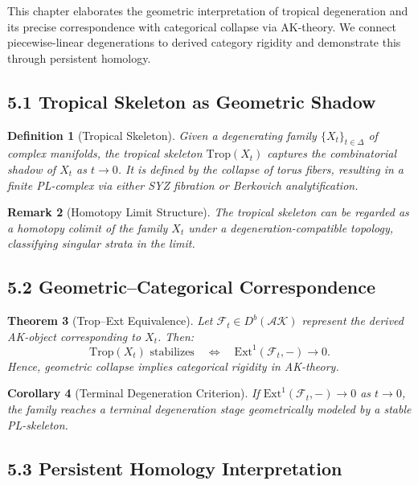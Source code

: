 \documentclass[11pt]{article}
\newtheorem{theorem}{Theorem}[section]
\newtheorem{definition}[theorem]{Definition}
\newtheorem{remark}[theorem]{Remark}
\newtheorem{corollary}[theorem]{Corollary}
\begin{document}
This chapter elaborates the geometric interpretation of tropical degeneration and its precise correspondence with categorical collapse via AK-theory. We connect piecewise-linear degenerations to derived category rigidity and demonstrate this through persistent homology.

\subsection{5.1 Tropical Skeleton as Geometric Shadow}

\begin{definition}[Tropical Skeleton]
Given a degenerating family $\{ X_t \}_{t \in \Delta}$ of complex manifolds, the tropical skeleton $\mathrm{Trop}(X_t)$ captures the combinatorial shadow of $X_t$ as $t \to 0$. It is defined by the collapse of torus fibers, resulting in a finite PL-complex via either SYZ fibration or Berkovich analytification.
\end{definition}

\begin{remark}[Homotopy Limit Structure]
The tropical skeleton can be regarded as a homotopy colimit of the family $X_t$ under a degeneration-compatible topology, classifying singular strata in the limit.
\end{remark}

\subsection{5.2 Geometric–Categorical Correspondence}

\begin{theorem}[Trop--Ext Equivalence]
Let $\mathcal{F}_t \in D^b(\mathcal{AK})$ represent the derived AK-object corresponding to $X_t$. Then:
\[
\mathrm{Trop}(X_t) \text{ stabilizes} \quad \Longleftrightarrow \quad \mathrm{Ext}^1(\mathcal{F}_t, -) \to 0.
\]
Hence, geometric collapse implies categorical rigidity in AK-theory.
\end{theorem}

\begin{corollary}[Terminal Degeneration Criterion]
If $\mathrm{Ext}^1(\mathcal{F}_t, -) \to 0$ as $t \to 0$, the family reaches a terminal degeneration stage geometrically modeled by a stable PL-skeleton.
\end{corollary}

\subsection{5.3 Persistent Homology Interpretation}
\end{document}
